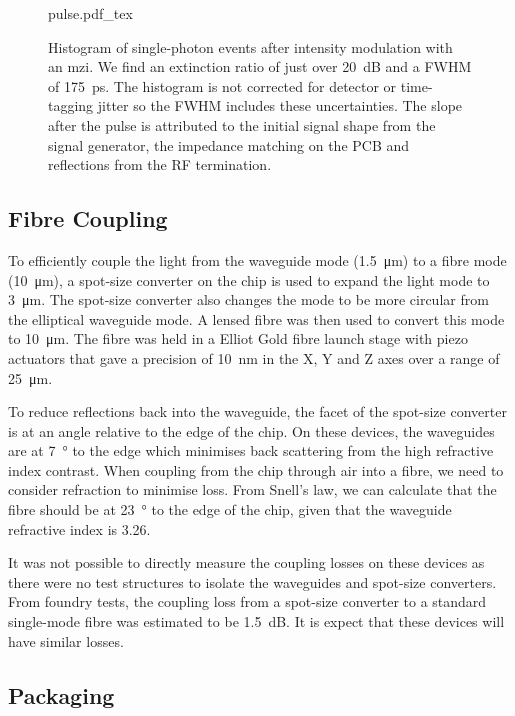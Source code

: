 \begin{figure}[tp]
	\centering
	\small
	\def\svgwidth{0.8\textwidth} 
	{pulse.pdf_tex}
	\caption[On-chip intensity modulation of coherent states]{Histogram of single-photon events after intensity modulation with an \ac{mzi}. We find an extinction ratio of just over \SI{20}{dB} and a \ac{FWHM} of \SI{175}{\ps}. The histogram is not corrected for detector or time-tagging jitter so the \ac{FWHM} includes these uncertainties. The slope after the pulse is attributed to the initial signal shape from the signal generator, the impedance matching on the PCB and reflections from the RF termination.}
	\label{fig:pulses}
\end{figure}

\subsection{Fibre Coupling}

To efficiently couple the light from the waveguide mode (\SI{1.5}{\um}) to a fibre mode (\SI{10}{\micro\metre}), a spot-size converter on the chip is used to expand the light mode to \SI{3}{\micro\meter}. The spot-size converter also changes the mode to be more circular from the elliptical waveguide mode. A lensed fibre was then used to convert this mode to \SI{10}{\micro\meter}. The fibre was held in a Elliot Gold fibre launch stage with piezo actuators that gave a precision of \SI{10}{\nm} in the X, Y and Z axes over a range of \SI{25}{\micro\meter}.

To reduce reflections back into the waveguide, the facet of the spot-size converter is at an angle relative to the edge of the chip. On these devices, the waveguides are at \SI{7}{\degree} to the edge which minimises back scattering from the high refractive index contrast. When coupling from the chip through air into a fibre, we need to consider refraction to minimise loss. From Snell's law, we can calculate that the fibre should be at \SI{23}{\degree} to the edge of the chip, given that the waveguide refractive index is 3.26.

It was not possible to directly measure the coupling losses on these devices as there were no test structures to isolate the waveguides and spot-size converters. From foundry tests, the coupling loss from a spot-size converter to a standard single-mode fibre was estimated to be \SI{1.5}{dB}. It is expect that these devices will have similar losses.

\subsection{Packaging}

